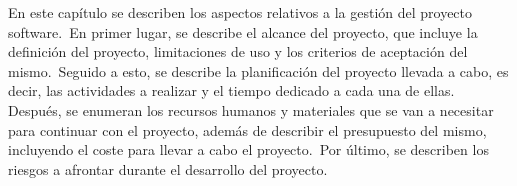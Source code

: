 
En este capítulo se describen los aspectos relativos a la gestión del proyecto software.\ En primer lugar, se
describe el alcance del proyecto, que incluye la definición del proyecto, limitaciones de uso y los criterios de
aceptación del mismo.\ Seguido a esto, se describe la planificación
del proyecto llevada a cabo, es decir, las actividades a realizar y el tiempo dedicado a cada una de ellas.
Después, se enumeran los recursos humanos y materiales que se van a necesitar
para continuar con el proyecto, además de describir el presupuesto del mismo, incluyendo el coste
para llevar a cabo el proyecto.\ Por último, se describen los riesgos a afrontar durante el desarrollo del proyecto.






